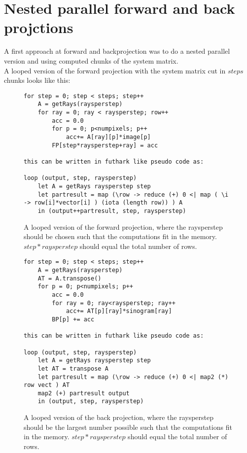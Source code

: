 \section{Nested parallel forward and back projctions}
A first approach at forward and backprojection was to do a nested parallel version and using computed chunks of the system matrix.\\
A looped version of the forward projection with the system matrix cut in $steps$ chunks looks like this:

\begin{figure}[h]
\begin{lstlisting}[frame=single]
for step = 0; step < steps; step++
	A = getRays(raysperstep)
	for ray = 0; ray < raysperstep; row++
		acc = 0.0
		for p = 0; p<numpixels; p++
			acc+= A[ray][p]*image[p]
		FP[step*raysperstep+ray] = acc

this can be written in futhark like pseudo code as:

loop (output, step, raysperstep)
	let A = getRays raysperstep step
	let partresult = map (\row -> reduce (+) 0 <| map ( \i -> row[i]*vector[i] ) (iota (length row)) ) A
	in (output++partresult, step, raysperstep)
\end{lstlisting}
\caption{A looped version of the forward projection, where the raysperstep should be chosen such that the computations fit in the memory. $step*raysperstep$ should equal the total number of rows.}
\end{figure}
\begin{figure}[h]
\begin{lstlisting}[frame=single]
for step = 0; step < steps; step++
	A = getRays(raysperstep)
	AT = A.transpose()
	for p = 0; p<numpixels; p++
		acc = 0.0
		for ray = 0; ray<raysperstep; ray++
			acc+= AT[p][ray]*sinogram[ray]
		BP[p] += acc

this can be written in futhark like pseudo code as:

loop (output, step, raysperstep)
	let A = getRays raysperstep step
	let AT = transpose A
	let partresult = map (\row -> reduce (+) 0 <| map2 (*) row vect ) AT
	map2 (+) partresult output
	in (output, step, raysperstep)
\end{lstlisting}
  \caption{A looped version of the back projection, where the raysperstep should be the largest number possible such that the computations fit in the memory. $step*raysperstep$ should equal the total number of rows.}
\end{figure}

